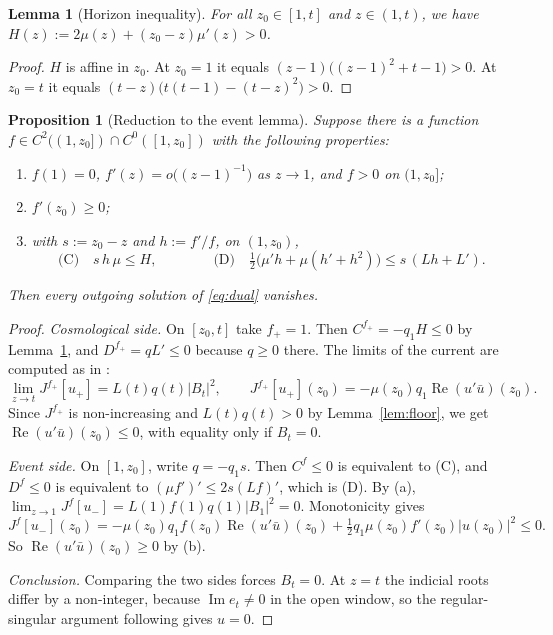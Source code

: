 \documentclass[11pt]{amsart}
\newtheorem{proposition}[theorem]{Proposition}
\newtheorem{lemma}[theorem]{Lemma}
\theoremstyle{definition}
\theoremstyle{remark}
\numberwithin{equation}{section}
\renewcommand{\Im}{\operatorname{Im}}
\renewcommand{\Re}{\operatorname{Re}}
\begin{document}
\begin{lemma}[Horizon inequality]\label{lem:H}
For all $z_0\in[1,t]$ and $z\in(1,t)$, we have $H(z):=2\mu(z)+(z_0-z)\mu'(z)>0$.
\end{lemma}
\begin{proof}
$H$ is affine in $z_0$. At $z_0=1$ it equals $(z-1)\big((z-1)^2+t-1\big)>0$. At $z_0=t$ it equals
$(t-z)\big(t(t-1)-(t-z)^2\big)>0$.
\end{proof}

\begin{proposition}[Reduction to the event lemma]\label{prop:reduction}
Suppose there is a function $f\in C^2((1,z_0])\cap C^0([1,z_0])$ with the following properties:
\begin{enumerate}[label=(\alph*)]
\item $f(1)=0$, $f'(z)=o\big((z-1)^{-1}\big)$ as $z\to1$, and $f>0$ on $(1,z_0]$;
\item $f'(z_0)\ge0$;
\item with $s:=z_0-z$ and $h:=f'/f$, on $(1,z_0)$,
\begin{equation}\label{eq:CD}
\text{(C)}\quad s\,h\,\mu\le H,\qquad\qquad \text{(D)}\quad \tfrac12\big(\mu'h+\mu(h'+h^2)\big)\le s\,(Lh+L').
\end{equation}
\end{enumerate}
Then every outgoing solution of \eqref{eq:dual} vanishes.
\end{proposition}

\begin{proof}
\emph{Cosmological side.} On $[z_0,t]$ take $f_+=1$. Then $C^{f_+}=-q_1H\le0$ by Lemma~\ref{lem:H}, and
$D^{f_+}=qL'\le0$ because $q\ge0$ there. The limits of the current are computed as in \cite[Lemma~4.2]{Hin26}:
\[
\lim_{z\to t}J^{f_+}[u_+]=L(t)q(t)|B_t|^2,\qquad J^{f_+}[u_+](z_0)=-\mu(z_0)q_1\Re(u'\bar u)(z_0).
\]
Since $J^{f_+}$ is non-increasing and $L(t)q(t)>0$ by Lemma~\ref{lem:floor}, we get $\Re(u'\bar u)(z_0)\le0$, with
equality only if $B_t=0$.

\emph{Event side.} On $[1,z_0]$, write $q=-q_1s$. Then $C^f\le0$ is equivalent to (C), and $D^f\le0$ is equivalent to
$(\mu f')'\le2s(Lf)'$, which is (D). By (a), $\lim_{z\to1}J^f[u_-]=L(1)f(1)q(1)|B_1|^2=0$. Monotonicity gives
\[
J^f[u_-](z_0)=-\mu(z_0)q_1f(z_0)\Re(u'\bar u)(z_0)+\tfrac12q_1\mu(z_0)f'(z_0)|u(z_0)|^2\le0.
\]
So $\Re(u'\bar u)(z_0)\ge0$ by (b).

\emph{Conclusion.} Comparing the two sides forces $B_t=0$. At $z=t$ the indicial roots differ by a non-integer,
because $\Im e_t\ne0$ in the open window, so the regular-singular argument following \cite[(3.6)]{Hin26} gives
$u=0$.
\end{proof}
\end{document}
